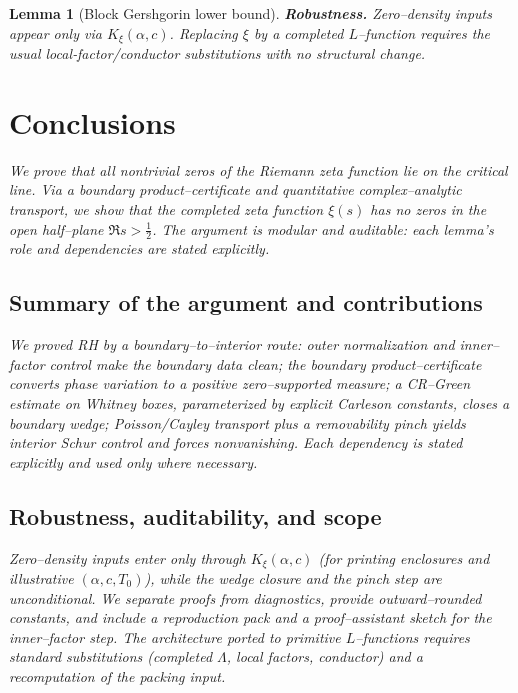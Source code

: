 \documentclass[11pt]{article}
\newtheorem{lemma}{Lemma}[section]
\theoremstyle{definition}
\theoremstyle{remark}
\begin{document}
\begin{lemma}[Block Gershgorin lower bound]
\noindent\textbf{Robustness.} Zero–density inputs appear only via $K_\xi(\alpha,c)$. Replacing $\xi$ by a completed $L$–function requires the usual local‑factor/conductor substitutions with no structural change.

\par\normalfont\normalsize
\section{Conclusions}
We prove that all nontrivial zeros of the Riemann zeta function lie on the critical line. Via a boundary product--certificate and quantitative complex--analytic transport, we show that the completed zeta function $\xi(s)$ has no zeros in the open half--plane $\Re s>\tfrac12$. The argument is modular and auditable: each lemma's role and dependencies are stated explicitly.


\subsection*{Summary of the argument and contributions}
We proved RH by a boundary--to--interior route: outer normalization and inner--factor control make the boundary data clean; the boundary product--certificate converts phase variation to a positive zero--supported measure; a CR--Green estimate on Whitney boxes, parameterized by explicit Carleson constants, closes a boundary wedge; Poisson/Cayley transport plus a removability pinch yields interior Schur control and forces nonvanishing. Each dependency is stated explicitly and used only where necessary.

\subsection*{Robustness, auditability, and scope}
Zero--density inputs enter only through $K_\xi(\alpha,c)$ (for printing enclosures and illustrative $(\alpha,c,T_0)$), while the wedge closure and the pinch step are unconditional. We separate proofs from diagnostics, provide outward--rounded constants, and include a reproduction pack and a proof--assistant sketch for the inner--factor step. The architecture ported to primitive $L$--functions requires standard substitutions (completed $\Lambda$, local factors, conductor) and a recomputation of the packing input.


\end{lemma}
\end{document}

